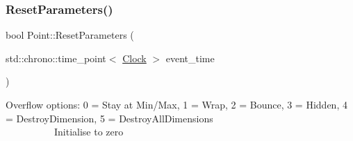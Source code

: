 \subsubsection{\texorpdfstring{Reset\+Parameters()}{ResetParameters()}}
{\footnotesize\ttfamily bool Point\+::\+Reset\+Parameters (\begin{DoxyParamCaption}\item[{std\+::chrono\+::time\+\_\+point$<$ \mbox{\hyperlink{universe_8h_a0ef8d951d1ca5ab3cfaf7ab4c7a6fd80}{Clock}} $>$}]{event\+\_\+time }\end{DoxyParamCaption})}

Overflow options\+: 0 = Stay at Min/\+Max, 1 = Wrap, 2 = Bounce, 3 = Hidden, 4 = Destroy\+Dimension, 5 = Destroy\+All\+Dimensions ~\newline
~\newline
~\newline
~\newline
~\newline
~\newline
~\newline
~\newline
~\newline
~\newline
~\newline
~\newline
~\newline
~\newline
~\newline
~\newline
~\newline
~\newline
~\newline
~\newline
~\newline
~\newline
~\newline
 Initialise to zero ~\newline
~\newline
~\newline
~\newline
~\newline
~\newline
~\newline
~\newline
~\newline
~\newline
~\newline
~\newline
~\newline
~\newline

